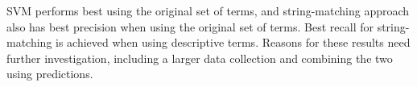 SVM performs best using the original set of terms, and string-matching approach also has best precision when using the original set of terms. Best recall for string-matching is achieved when using descriptive terms. Reasons for these results need further investigation, including a larger data collection and combining the two using predictions. 

